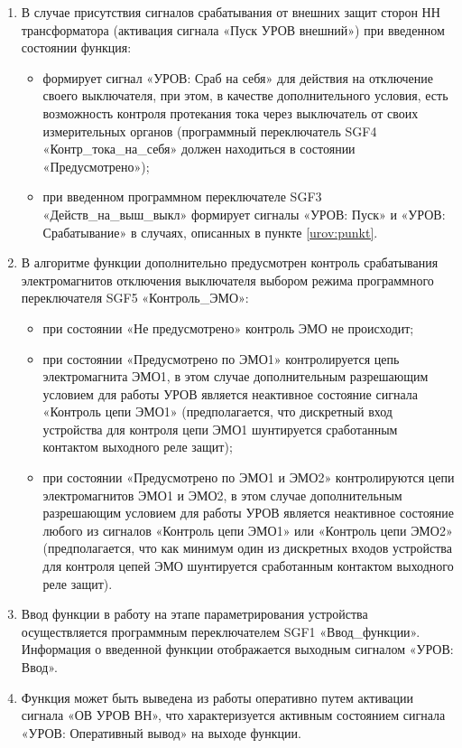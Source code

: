 \begin{enumerate}
\begin{itemize}
\end{itemize}
\item
В случае присутствия сигналов срабатывания от внешних защит сторон НН трансформатора (активация сигнала «Пуск УРОВ внешний») при введенном состоянии функция: 
\begin{itemize}
	\item формирует сигнал «УРОВ: Сраб на себя» для действия на отключение своего выключателя, при этом, в качестве дополнительного условия, есть возможность контроля протекания тока через выключатель от своих измерительных органов (программный переключатель SGF4 «Контр\_тока\_на\_себя» должен находиться в состоянии «Предусмотрено»);
	\item при введенном программном переключателе SGF3 «Действ\_на\_выш\_выкл» формирует сигналы «УРОВ: Пуск» и «УРОВ: Срабатывание» в случаях, описанных в пункте \ref{urov:punkt}.
\end{itemize}

\item
В алгоритме функции дополнительно предусмотрен контроль срабатывания электромагнитов отключения выключателя выбором режима программного переключателя SGF5 «Контроль\_ЭМО»:
\begin{itemize}
	\item при состоянии «Не предусмотрено» контроль ЭМО не происходит;
	\item при состоянии «Предусмотрено по ЭМО1» контролируется цепь электромагнита ЭМО1, в этом случае дополнительным разрешающим условием для работы УРОВ является неактивное состояние сигнала «Контроль цепи ЭМО1» (предполагается, что дискретный вход устройства для контроля цепи ЭМО1 шунтируется сработанным контактом выходного реле защит);
	\item при состоянии «Предусмотрено по ЭМО1 и ЭМО2» контролируются цепи электромагнитов ЭМО1 и ЭМО2, в этом случае дополнительным разрешающим условием для работы УРОВ является неактивное состояние любого из сигналов «Контроль цепи ЭМО1» или «Контроль цепи ЭМО2» (предполагается, что как минимум один из дискретных входов устройства для контроля цепей ЭМО шунтируется сработанным контактом выходного реле защит).
\end{itemize}

\item
Ввод функции в работу на этапе параметрирования устройства осуществляется программным переключателем SGF1 «Ввод\_функции». Информация о введенной функции отображается выходным сигналом «УРОВ: Ввод».
\item
Функция может быть выведена из работы оперативно путем активации сигнала «ОВ УРОВ ВН», что характеризуется активным состоянием сигнала «УРОВ: Оперативный вывод» на выходе функции.


\end{enumerate}
